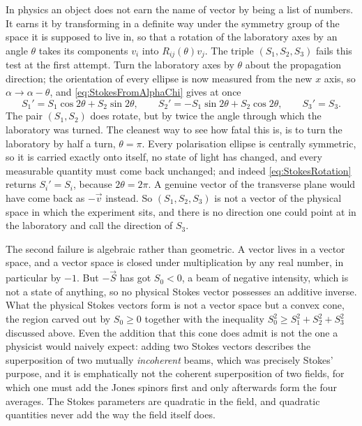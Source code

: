             In physics an object does not earn the name of vector by being a list of numbers. It earns it by transforming in a definite way under the symmetry group of the space it is supposed to live in, so that a rotation of the laboratory axes by an angle $\theta$ takes its components $v_i$ into $R_{ij}(\theta)v_j$. The triple $(S_1,S_2,S_3)$ fails this test at the first attempt. Turn the laboratory axes by $\theta$ about the propagation direction; the orientation of every ellipse is now measured from the new $x$ axis, so $\alpha\to\alpha-\theta$, and \ref{eq:StokesFromAlphaChi} gives at once
            \begin{equation}\label{eq:StokesRotation}
                S_1' = S_1\cos2\theta+S_2\sin2\theta, \qquad S_2' = -S_1\sin2\theta+S_2\cos2\theta, \qquad S_3'=S_3.
            \end{equation}
            The pair $(S_1,S_2)$ does rotate, but by twice the angle through which the laboratory was turned. The cleanest way to see how fatal this is, is to turn the laboratory by half a turn, $\theta=\pi$. Every polarisation ellipse is centrally symmetric, so it is carried exactly onto itself, no state of light has changed, and every measurable quantity must come back unchanged; and indeed \ref{eq:StokesRotation} returns $S_i'=S_i$, because $2\theta=2\pi$. A genuine vector of the transverse plane would have come back as $-\vec{v}$ instead. So $(S_1,S_2,S_3)$ is not a vector of the physical space in which the experiment sits, and there is no direction one could point at in the laboratory and call the direction of $S_3$.

            The second failure is algebraic rather than geometric. A vector lives in a vector space, and a vector space is closed under multiplication by any real number, in particular by $-1$. But $-\vec{S}$ has got $S_0<0$, a beam of negative intensity, which is not a state of anything, so no physical Stokes vector possesses an additive inverse. What the physical Stokes vectors form is not a vector space but a convex cone, the region carved out by $S_0\geq0$ together with the inequality $S_0^2\geq S_1^2+S_2^2+S_3^2$ discussed above. Even the addition that this cone does admit is not the one a physicist would naively expect: adding two Stokes vectors describes the superposition of two mutually \textit{incoherent} beams, which was precisely Stokes' purpose, and it is emphatically not the coherent superposition of two fields, for which one must add the Jones spinors first and only afterwards form the four averages. The Stokes parameters are quadratic in the field, and quadratic quantities never add the way the field itself does.


